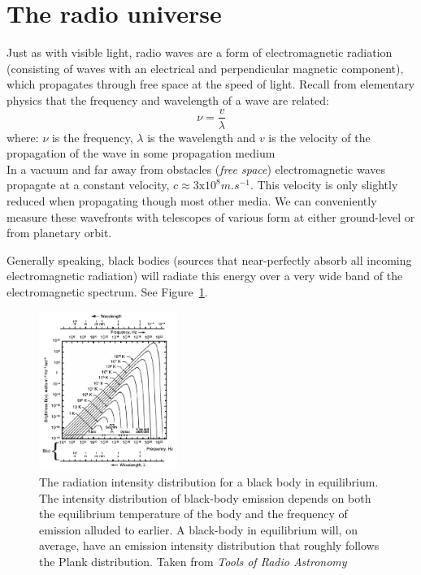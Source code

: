 \section{The radio universe}
Just as with visible light, radio waves are a form of electromagnetic radiation (consisting of waves with an electrical and perpendicular magnetic component), which propagates through free space at the speed 
of light. Recall from elementary physics that the frequency and wavelength of a wave are related:
\begin{equation*}
 \nu = \frac{v}{\lambda}
\end{equation*}
where: $\nu$ is the frequency, $\lambda$ is the wavelength and $v$ is the velocity of the propagation of the wave in some propagation medium\\

In a vacuum and far away from obstacles (\textit{free space}) electromagnetic waves propagate at a constant velocity, $c\approx 3\text{x}10^8m.s^{-1}$. This velocity is only slightly reduced
when propagating though most other media. We can conveniently measure these wavefronts with telescopes of various form at either ground-level or from planetary orbit. 

Generally speaking, black bodies (sources that near-perfectly absorb all incoming electromagnetic radiation) will radiate this energy over a very wide 
band of the electromagnetic spectrum. See Figure~\ref{fig_plank}. 

\begin{figure}[ht]
 \begin{mdframed}
 \centering
 \includegraphics[width=0.4\textwidth]{images/plank_dist.png}
 \caption[Black body radiation]{The radiation intensity distribution for a black body in equilibrium. The intensity distribution of black-body emission depends on both the equilibrium temperature of the body and 
  the frequency of emission alluded to earlier. A black-body in equilibrium will, on average, have an emission intensity distribution that roughly follows the Plank 
  distribution. Taken from \textit{Tools of Radio Astronomy} \cite{wilson2009tools}}
  \label{fig_plank}
 \end{mdframed}
\end{figure}

